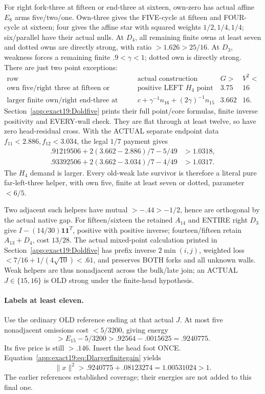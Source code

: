 \documentclass[11pt]{article}
\theoremstyle{definition}
\theoremstyle{remark}
\begin{document}
For right fork-three at fifteen or end-three at sixteen, own-zero has
actual affine \(E_8\) arms five/two/one.
Own-three gives the FIVE-cycle at fifteen and FOUR-cycle at sixteen;
four gives the affine star with squared weights \(1/2,1/4,1/4\);
six/parallel have their actual nulls.
At \(D_4\), all remaining finite owns at least seven and dotted owns
are directly strong, with ratio \(>1.626>25/16\).
At \(D_3\), weakness forces a remaining finite \(.9<\gamma<1\);
dotted own is directly strong.
There are just two point exceptions:
\[
\begin{array}{c|c|c|c}
 \text{row}&\text{actual construction}&G>&V^2<\\ \hline
 \text{own five/right three at fifteen or sixteen}
            &\text{positive LEFT }H_4\text{ point}&3.75&16\\
 \text{larger finite own/right end-three at sixteen}
            &c+\gamma^{-1}n_{16}+(2\gamma)^{-1}n_{15}&3.662&16 .
\end{array}
\]
Section~\ref{app:exact19:Doldfive} prints their full point/core
formulas, finite inverse positivity and EVERY-wall check.
They are flat through at least twelve, so have zero head-residual
cross. With the ACTUAL separate endpoint data
\(f_{11}<2.886,f_{12}<3.034\), the legal \(1/7\) payment gives
\[
\begin{split}
 .91219506+2(3.662-2.886)/7-5/49&>1.0318,\\
 .93392506+2(3.662-3.034)/7-4/49&>1.0317 .
\end{split}
\]
The \(H_4\) demand is larger.
Every old-weak late survivor is therefore a literal pure far-left-three
helper, with own five, finite at least seven or dotted, parameter \(<6/5\).

Two adjacent such helpers have mutual \(>-.44>-1/2\), hence are
orthogonal by the actual native gap.
For fifteen/sixteen the retained \(A_{14}\) and ENTIRE right \(D_3\)
give \(I-(14/30)\mathbf1\mathbf1^T\), positive with positive inverse;
fourteen/fifteen retain \(A_{13}+D_4\), cost \(13/28\).
The actual mixed-point calculation printed in
Section~\ref{app:exact19:Doldfive} has prefix inverse \(2\min(i,j)\),
weighted loss \(<7/16+1/(4\sqrt{10})<.61\), and preserves BOTH forks
and all unknown walls.
Weak helpers are thus nonadjacent across the bulk/late join; an ACTUAL
\(J\in\{15,16\}\) is OLD strong under the finite-head hypothesis.

\paragraph{Labels at least eleven.}
Use the ordinary OLD reference ending at that actual \(J\).
At most five nonadjacent omissions cost \(<5/3200\), giving energy
\[
                        >E_{15}-5/3200>.92564-.0015625=.9240775 .
\]
Its five price is still \(>.146\).
Insert the head foot ONCE.
Equation~\eqref{app:exact19:eq:Dlargerfinitegain} yields
\[
                         \|x\|^2>.9240775+.08123274=1.00531024>1 .
\]
The earlier references established coverage; their energies are not
added to this final one.
\end{document}
